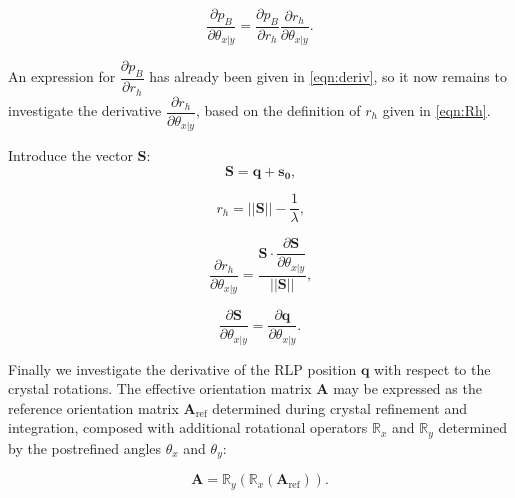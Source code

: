 \documentclass[12pt, letterpaper]{article}
\begin{document}
   \begin{equation}
   \frac{\partial p_B} {\partial \theta_{x\mathrm{|}y}} = 
  \frac{\partial p_B}{\partial r_h}
   \frac{\partial r_h} {\partial \theta_{x\mathrm{|}y}}
    \text{.}
    \label{eqn:dpb2}
  \end{equation}


  \par An expression for $\dfrac{\partial p_B}{\partial r_h}$ has already been 
  given in \eqref{eqn:deriv}, so it now
  remains to investigate the derivative $\dfrac{\partial r_h} {\partial \theta_{x\mathrm{|}y}}$,
  based on the definition of $r_h$ given in \eqref{eqn:Rh}.

Introduce the vector $\mathbf{S}$:
   \begin{equation}
   \mathbf{S} = \mathbf{q}+\mathbf{s_0}
    \text{,}
    \label{eqn:SS}
  \end{equation}

   \begin{equation}
 {r_h} = ||\mathbf{S}||-\dfrac{1}{ \lambda}
     \text{,}
    \label{eqn:sss}
  \end{equation}
  
    \begin{equation}
   \dfrac{\partial r_h} {\partial \theta_{x\mathrm{|}y}} = 
   \dfrac
   {\mathbf{S}\cdot{
   \dfrac{\partial \mathbf{S}} {\partial \theta_{x\mathrm{|}y}}
   }}
   {||\mathbf{S}||}
    \text{,}
    \label{eqn:rhth}
  \end{equation}

    \begin{equation}
   \dfrac{\partial \mathbf{S}} {\partial \theta_{x\mathrm{|}y}} = 
  {
   \dfrac{\partial \mathbf{q}} {\partial \theta_{x\mathrm{|}y}}
   }
    \text{.}
    \label{eqn:derivsq}
  \end{equation}

Finally we investigate the derivative of the RLP position $\mathbf{q}$ with respect to the crystal 
rotations.  The effective orientation matrix $\mathbf{A}$ may be expressed as the 
reference orientation matrix $\mathbf{A}_\mathrm{ref}$ determined during crystal refinement and 
integration, composed with additional rotational operators $\mathbb{R}_x$ and 
$\mathbb{R}_y$ determined by the postrefined angles $\theta_{x}$ and 
$\theta_{y}$:

    \begin{equation}
   \mathbf{A} = 
\mathbb{R}_y( \mathbb{R}_x ( \mathbf{A}_\mathrm{ref} )  )
    \text{.}
    \label{eqn:compoase}
  \end{equation}
\end{document}
